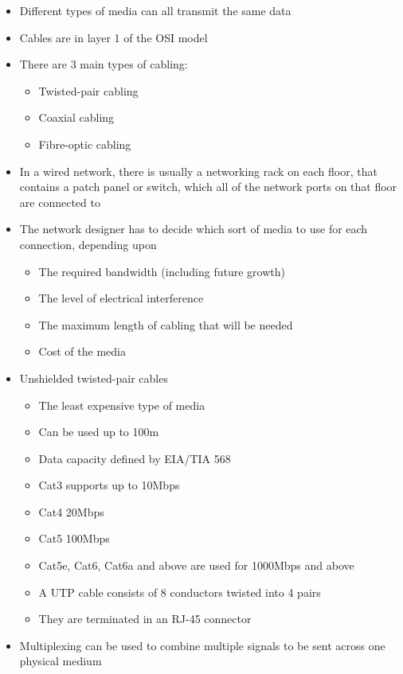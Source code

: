 
\begin{itemize}
  \item Different types of media can all transmit the same data
  \item Cables are in layer 1 of the OSI model
  \item There are 3 main types of cabling:
  \begin{itemize}
    \item Twisted-pair cabling
    \item Coaxial cabling
    \item Fibre-optic cabling
  \end{itemize}
  \item In a wired network, there is usually a networking rack on each floor, that contains a patch panel or switch, which all of the network ports on that floor are connected to
  \item The network designer has to decide which sort of media to use for each connection, depending upon
  \begin{itemize}
    \item The required bandwidth (including future growth)
    \item The level of electrical interference
    \item The maximum length of cabling that will be needed
    \item Cost of the media
  \end{itemize}
  \item Unshielded twisted-pair cables
  \begin{itemize}
    \item The least expensive type of media
    \item Can be used up to 100m
    \item Data capacity defined by EIA/TIA 568
    \item Cat3 supports up to 10Mbps
    \item Cat4 20Mbps
    \item Cat5 100Mbps
    \item Cat5e, Cat6, Cat6a and above are used for 1000Mbps and above
    \item A UTP cable consists of 8 conductors twisted into 4 pairs
    \item They are terminated in an RJ-45 connector
  \end{itemize}
  \item Multiplexing can be used to combine multiple signals to be sent across one physical medium

\end{itemize}
